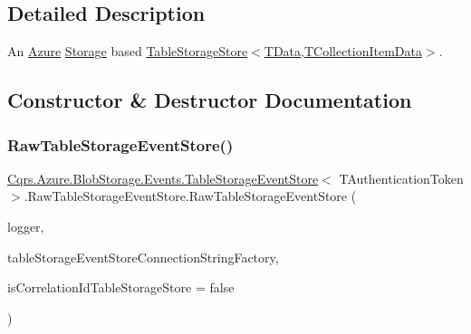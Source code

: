 \subsection{Detailed Description}
An \hyperlink{namespaceCqrs_1_1Azure}{Azure} \hyperlink{namespaceCqrs_1_1Azure_1_1Storage}{Storage} based \hyperlink{classCqrs_1_1Azure_1_1BlobStorage_1_1TableStorageStore_aabc36bc46ffb22b716cc7769a641cfab_aabc36bc46ffb22b716cc7769a641cfab}{Table\+Storage\+Store$<$\+T\+Data,\+T\+Collection\+Item\+Data$>$}. 



\subsection{Constructor \& Destructor Documentation}
\mbox{\label{classCqrs_1_1Azure_1_1BlobStorage_1_1Events_1_1TableStorageEventStore_1_1RawTableStorageEventStore_aa6aa02462732467a16148e0d094cd308_aa6aa02462732467a16148e0d094cd308}} 
\subsubsection{\texorpdfstring{Raw\+Table\+Storage\+Event\+Store()}{RawTableStorageEventStore()}}
{\footnotesize\ttfamily \hyperlink{classCqrs_1_1Azure_1_1BlobStorage_1_1Events_1_1TableStorageEventStore}{Cqrs.\+Azure.\+Blob\+Storage.\+Events.\+Table\+Storage\+Event\+Store}$<$ T\+Authentication\+Token $>$.Raw\+Table\+Storage\+Event\+Store.\+Raw\+Table\+Storage\+Event\+Store (\begin{DoxyParamCaption}\item[{I\+Logger}]{logger,  }\item[{\hyperlink{interfaceCqrs_1_1Azure_1_1BlobStorage_1_1ITableStorageStoreConnectionStringFactory}{I\+Table\+Storage\+Store\+Connection\+String\+Factory}}]{table\+Storage\+Event\+Store\+Connection\+String\+Factory,  }\item[{bool}]{is\+Correlation\+Id\+Table\+Storage\+Store = {\ttfamily false} }\end{DoxyParamCaption})}




